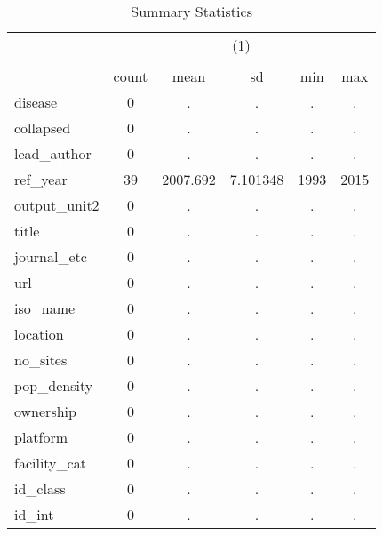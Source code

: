 \begin{table}[htbp]\centering
\def\sym#1{\ifmmode^{#1}\else\(^{#1}\)\fi}
\caption{Summary Statistics}
\begin{tabular}{l*{1}{ccccc}}
\hline\hline
            &\multicolumn{5}{c}{(1)}                                         \\
            &\multicolumn{5}{c}{}                                            \\
            &       count&        mean&          sd&         min&         max\\
\hline
disease     &           0&           .&           .&           .&           .\\
collapsed   &           0&           .&           .&           .&           .\\
lead\_author &           0&           .&           .&           .&           .\\
ref\_year    &          39&    2007.692&    7.101348&        1993&        2015\\
output\_unit2&           0&           .&           .&           .&           .\\
title       &           0&           .&           .&           .&           .\\
journal\_etc &           0&           .&           .&           .&           .\\
url         &           0&           .&           .&           .&           .\\
iso\_name    &           0&           .&           .&           .&           .\\
location    &           0&           .&           .&           .&           .\\
no\_sites    &           0&           .&           .&           .&           .\\
pop\_density &           0&           .&           .&           .&           .\\
ownership   &           0&           .&           .&           .&           .\\
platform    &           0&           .&           .&           .&           .\\
facility\_cat&           0&           .&           .&           .&           .\\
id\_class    &           0&           .&           .&           .&           .\\
id\_int      &           0&           .&           .&           .&           .\\

\end{tabular}
\end{table}
